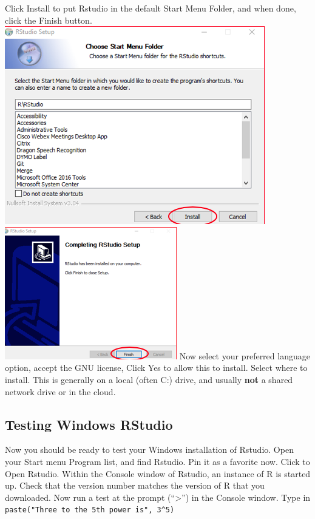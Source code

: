 \documentclass[
]{book}
\begin{document}
Click Install to put Rstudio in the default Start Menu Folder, and when done, click the Finish button.
\includegraphics{images/rstudio_winstall_start.png}
\includegraphics{images/winstall_finish.png}
Now select your preferred language option, accept the GNU license, Click Yes to allow this to install. Select where to install. This is generally on a local (often C:) drive, and usually \textbf{not} a shared network drive or in the cloud.

\hypertarget{testing-windows-rstudio}{%
\subsection{Testing Windows RStudio}\label{testing-windows-rstudio}}

Now you should be ready to test your Windows installation of Rstudio.
Open your Start menu Program list, and find Rstudio.
Pin it as a favorite now.
Click to Open Rstudio.
Within the Console window of Rstudio, an instance of R is started up. Check that the version number matches the version of R that you downloaded.
Now run a test at the prompt (``\textgreater{}'') in the Console window. Type in
\texttt{paste("Three\ to\ the\ 5th\ power\ is",\ 3\^{}5)}
\end{document}
